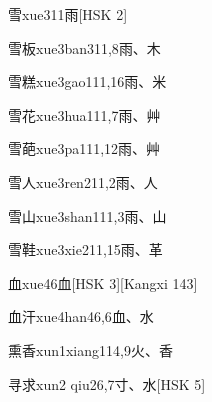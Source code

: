 \begin{entry}{雪}{xue3}{11}{⾬}[HSK 2]
\end{entry}

\begin{entry}{雪板}{xue3ban3}{11,8}{⾬、⽊}
\end{entry}

\begin{entry}{雪糕}{xue3gao1}{11,16}{⾬、⽶}
\end{entry}

\begin{entry}{雪花}{xue3hua1}{11,7}{⾬、⾋}
\end{entry}

\begin{entry}{雪葩}{xue3pa1}{11,12}{⾬、⾋}
\end{entry}

\begin{entry}{雪人}{xue3ren2}{11,2}{⾬、⼈}
\end{entry}

\begin{entry}{雪山}{xue3shan1}{11,3}{⾬、⼭}
\end{entry}

\begin{entry}{雪鞋}{xue3xie2}{11,15}{⾬、⾰}
\end{entry}

\begin{entry}{血}{xue4}{6}{⾎}[HSK 3][Kangxi 143]
\end{entry}

\begin{entry}{血汗}{xue4han4}{6,6}{⾎、⽔}
\end{entry}

\begin{entry}{熏香}{xun1xiang1}{14,9}{⽕、⾹}
\end{entry}

\begin{entry}{寻求}{xun2 qiu2}{6,7}{⼨、⽔}[HSK 5]
\end{entry}

